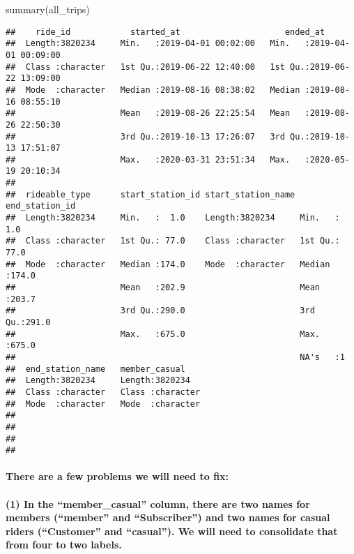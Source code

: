 \documentclass[
]{article}
\newenvironment{Shaded}{\begin{snugshade}}{\end{snugshade}}
\newcommand{\FunctionTok}[1]{\textcolor[rgb]{0.00,0.00,0.00}{#1}}
\newcommand{\NormalTok}[1]{#1}
\begin{document}
\begin{Shaded}
\begin{Highlighting}[]
\FunctionTok{summary}\NormalTok{(all\_trips)}
\end{Highlighting}
\end{Shaded}

\begin{verbatim}
##    ride_id            started_at                     ended_at                  
##  Length:3820234     Min.   :2019-04-01 00:02:00   Min.   :2019-04-01 00:09:00  
##  Class :character   1st Qu.:2019-06-22 12:40:00   1st Qu.:2019-06-22 13:09:00  
##  Mode  :character   Median :2019-08-16 08:38:02   Median :2019-08-16 08:55:10  
##                     Mean   :2019-08-26 22:25:54   Mean   :2019-08-26 22:50:30  
##                     3rd Qu.:2019-10-13 17:26:07   3rd Qu.:2019-10-13 17:51:07  
##                     Max.   :2020-03-31 23:51:34   Max.   :2020-05-19 20:10:34  
##                                                                                
##  rideable_type      start_station_id start_station_name end_station_id 
##  Length:3820234     Min.   :  1.0    Length:3820234     Min.   :  1.0  
##  Class :character   1st Qu.: 77.0    Class :character   1st Qu.: 77.0  
##  Mode  :character   Median :174.0    Mode  :character   Median :174.0  
##                     Mean   :202.9                       Mean   :203.7  
##                     3rd Qu.:290.0                       3rd Qu.:291.0  
##                     Max.   :675.0                       Max.   :675.0  
##                                                         NA's   :1      
##  end_station_name   member_casual     
##  Length:3820234     Length:3820234    
##  Class :character   Class :character  
##  Mode  :character   Mode  :character  
##                                       
##                                       
##                                       
## 
\end{verbatim}

\hypertarget{there-are-a-few-problems-we-will-need-to-fix}{%
\paragraph{There are a few problems we will need to
fix:}\label{there-are-a-few-problems-we-will-need-to-fix}}

\hypertarget{in-the-member_casual-column-there-are-two-names-for-members-member-and-subscriber-and-two-names-for-casual-riders-customer-and-casual.-we-will-need-to-consolidate-that-from-four-to-two-labels.}{%
\paragraph{(1) In the ``member\_casual'' column, there are two names for
members (``member'' and ``Subscriber'') and two names for casual riders
(``Customer'' and ``casual''). We will need to consolidate that from
four to two
labels.}\label{in-the-member_casual-column-there-are-two-names-for-members-member-and-subscriber-and-two-names-for-casual-riders-customer-and-casual.-we-will-need-to-consolidate-that-from-four-to-two-labels.}}
\end{document}
